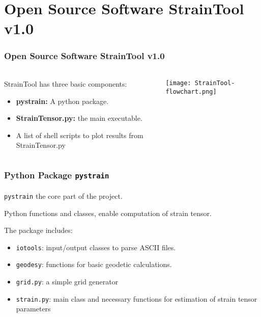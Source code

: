 \section{Open Source Software \textbf{StrainTool v1.0}}
 
\graphicspath{{Chapter2/Figs/}}

\begin{frame}
  \frametitle{Open Source Software \textbf{StrainTool v1.0}}
  \framesubtitle{\citep{anastasiou2019}}
  \label{ch2:straintool}
  
  \begin{columns}
    \begin{column}{0.5\textwidth}
      StrainTool has three basic components:
      \begin{itemize}
        \item \textbf{pystrain:} A python package.
        \item \textbf{StrainTensor.py:} the main executable.
        \item A list of shell scripts to plot results from StrainTensor.py
      \end{itemize}
    \end{column}
    \begin{column}{0.5\textwidth}
      \texttt{[image: StrainTool-flowchart.png]} 
    \end{column}
  \end{columns}
\end{frame}
\note{}


\begin{frame}
  \frametitle{Python Package \texttt{pystrain}}
  \framesubtitle{}
  \label{ch2:}
  
  \texttt{pystrain} the core part of the project.
  
  Python functions and classes, enable computation of strain tensor.
  
  The package includes:
  \begin{itemize}
    \item \texttt{iotools}: input/output classes to parse ASCII files.
    \item \texttt{geodesy}: functions for basic geodetic calculations.
    \item \texttt{grid.py}: a simple grid generator
    \item \texttt{strain.py}: main class and necessary functions for estimation of strain  tensor parameters
  \end{itemize}
  
  

\end{frame}
\note{}


